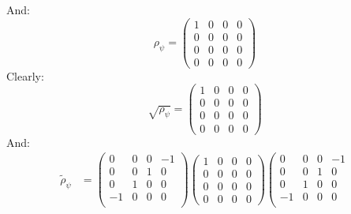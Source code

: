 \documentclass[12pt,a4]{article}
\begin{document}
\begin{enumerate}
\begin{enumerate}
        And:
        \begin{equation*}
          \rho_\psi = 
            \left(
            \begin{matrix}
              1 & 0 & 0 & 0\\
              0 & 0 & 0 & 0\\
              0 & 0 & 0 & 0\\
              0 & 0 & 0 & 0
            \end{matrix}
            \right)
        \end{equation*}
        Clearly:
        \begin{equation*}
          \sqrt{\rho_\psi} = 
            \left(
            \begin{matrix}
              1 & 0 & 0 & 0\\
              0 & 0 & 0 & 0\\
              0 & 0 & 0 & 0\\
              0 & 0 & 0 & 0
            \end{matrix}
            \right)
        \end{equation*}
        And:
        \begin{align*}
          \tilde\rho_\psi
            &= 
            \left(
              \begin{matrix}
                0 & 0 & 0 & -1\\
                0 & 0 & 1 &  0\\
                0 & 1 & 0 &  0\\
               -1 & 0 & 0 &  0\\
              \end{matrix}
            \right)
            \left(
            \begin{matrix}
              1 & 0 & 0 & 0\\
              0 & 0 & 0 & 0\\
              0 & 0 & 0 & 0\\
              0 & 0 & 0 & 0
            \end{matrix}
            \right)
            \left(
              \begin{matrix}
                0 & 0 & 0 & -1\\
                0 & 0 & 1 &  0\\
                0 & 1 & 0 &  0\\
               -1 & 0 & 0 &  0\\
              \end{matrix}

\end{align*}
\end{enumerate}
\end{enumerate}
\end{document}
